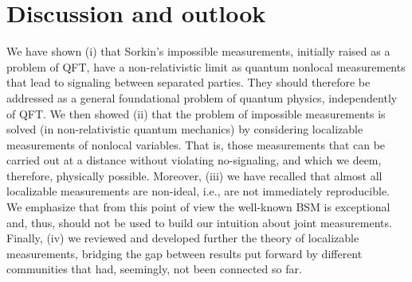 \documentclass[12pt]{article}
\begin{document}
\section{Discussion and outlook}
We have shown (i) that Sorkin's impossible measurements, initially raised as a problem of QFT, have a non-relativistic limit as quantum nonlocal measurements that lead to signaling between separated parties. They should therefore be addressed as a general foundational  problem of quantum physics, independently of QFT. We then showed (ii) that the problem of impossible measurements is solved (in non-relativistic quantum mechanics) by considering localizable measurements of nonlocal variables. That is, those measurements that can be carried out at a distance without violating no-signaling, and which we deem, therefore, physically possible. Moreover, (iii) we have recalled that almost all localizable measurements are non-ideal, i.e., are not immediately reproducible. We emphasize that from this point of view the well-known BSM is exceptional and, thus, should not be used to build our intuition about joint measurements. Finally, (iv) we reviewed and developed further the theory of localizable measurements, bridging the gap between results put forward by different communities that had, seemingly, not been connected so far. 
\end{document}
